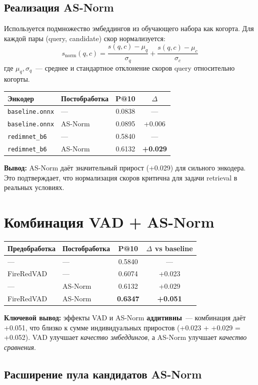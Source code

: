 \documentclass[12pt,a4paper]{article}
\begin{document}
\subsection{Реализация AS-Norm}

Используется подмножество эмбеддингов из обучающего набора как когорта. Для каждой пары (query, candidate) скор нормализуется:
\[
  s_{\text{norm}}(q, c) = \frac{s(q,c) - \mu_q}{\sigma_q} + \frac{s(q,c) - \mu_c}{\sigma_c}
\]
где $\mu_q, \sigma_q$~--- среднее и стандартное отклонение скоров query относительно когорты.

\begin{tabular}{l l c c}
\hline
Энкодер & Постобработка & P@10 & $\Delta$ \\
\hline
\texttt{baseline.onnx} & --- & 0.0838 & --- \\
\texttt{baseline.onnx} & AS-Norm & 0.0895 & +0.006 \\
\texttt{redimnet\_b6} & --- & 0.5840 & --- \\
\texttt{redimnet\_b6} & AS-Norm & 0.6132 & \textbf{+0.029} \\
\hline
\end{tabular}

\bigskip
\textbf{Вывод:} AS-Norm даёт значительный прирост (+0.029) для сильного энкодера. Это подтверждает, что нормализация скоров критична для задачи retrieval в реальных условиях.

\section{Комбинация VAD + AS-Norm}

\begin{tabular}{l l c c}
\hline
Предобработка & Постобработка & P@10 & $\Delta$ vs baseline \\
\hline
--- & --- & 0.5840 & --- \\
FireRedVAD & --- & 0.6074 & +0.023 \\
--- & AS-Norm & 0.6132 & +0.029 \\
FireRedVAD & AS-Norm & \textbf{0.6347} & \textbf{+0.051} \\
\hline
\end{tabular}

\bigskip
\textbf{Ключевой вывод:} эффекты VAD и AS-Norm \textbf{аддитивны}~--- комбинация даёт +0.051, что близко к сумме индивидуальных приростов (+0.023 + +0.029 = +0.052). VAD улучшает \emph{качество эмбеддингов}, а AS-Norm улучшает \emph{качество сравнения}.

\subsection{Расширение пула кандидатов AS-Norm}
\end{document}
